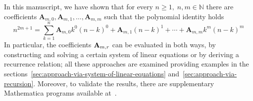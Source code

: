 In this manuscript, we have shown that for every $n\geq 1, \; n,m\in\mathbb{N}$
there are coefficients $\mathbf{A}_{m,0}, \mathbf{A}_{m,1}, \ldots, \mathbf{A}_{m,m}$ such that
the polynomial identity holds
\[
    n^{2m+1} = \sum_{k=1}^{n} \mathbf{A}_{m,0} k^0 (n-k)^0 + \mathbf{A}_{m,1}(n-k)^1
    + \cdots + \mathbf{A}_{m,m} k^m (n-k)^m
\]
In particular, the coefficients ${\mathbf{A}} \sb{m,r}$ can be evaluated in both ways,
by constructing and solving a certain system of linear equations or by deriving a recurrence relation;
all these approaches are examined providing examples
in the sections~\ref{sec:approach-via-system-of-linear-equations} and~\ref{sec:approach-via-recursion}.
Moreover, to validate the results,
there are supplementary Mathematica programs available at~\cite{kolosov2023github}.
